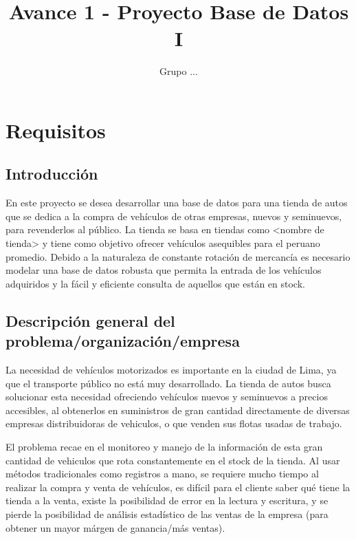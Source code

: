 \documentclass[12pt]{article}
\title{Avance 1 - Proyecto Base de Datos I}
\author{Grupo ...}
\begin{document}
\maketitle

\tableofcontents

\newpage

\section{Requisitos}

\subsection{Introducci\'on}

En este proyecto se desea desarrollar una base de datos para una tienda de autos que se dedica a la compra de vehículos de otras empresas, nuevos y seminuevos, para revenderlos al público. La tienda se basa en tiendas como <nombre de tienda> y tiene como objetivo ofrecer vehículos asequibles para el peruano promedio. Debido a la naturaleza de constante rotación de mercancía es necesario modelar una base de datos robusta que permita la entrada de los vehículos adquiridos y la fácil y eficiente consulta de aquellos que están en stock. 

\subsection{Descripci\'on general del problema/organizaci\'on/empresa}

La necesidad de vehículos motorizados es importante en la ciudad de Lima, ya que el transporte público no está muy desarrollado. La tienda de autos busca solucionar esta necesidad ofreciendo vehículos nuevos y seminuevos a precios accesibles, al obtenerlos en suministros de gran cantidad directamente de diversas empresas distribuidoras de vehiculos, o que venden sus flotas usadas de trabajo.

El problema recae en el monitoreo y manejo de la información de esta gran cantidad de vehiculos que rota constantemente en el stock de la tienda. Al usar métodos tradicionales como registros a mano, se requiere mucho tiempo al realizar la compra y venta de vehículos, es difícil para el cliente saber qué tiene la tienda a la venta, existe la posibilidad de error en la lectura y escritura, y se pierde la posibilidad de análisis estadístico de las ventas de la empresa (para obtener un mayor márgen de ganancia/más ventas).
\end{document}
